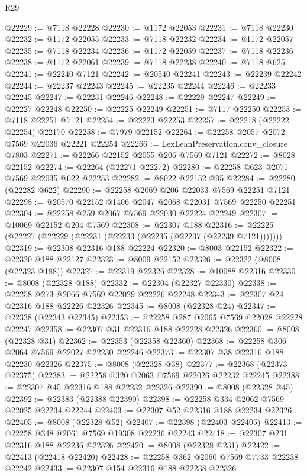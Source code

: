 \begin{lexlean}{R29}
\begin{coremodule}
@22229 := @7118 @22228
@22230 := @1172 @22053
@22231 := @7118 @22230
@22232 := @1172 @22055
@22233 := @7118 @22232
@22234 := @1172 @22057
@22235 := @7118 @22234
@22236 := @1172 @22059
@22237 := @7118 @22236
@22238 := @1172 @22061
@22239 := @7118 @22238
@22240 := @7118 @625
@22241 := @22240 @7121
@22242 := @20540 @22241
@22243 := @22239 @22242
@22244 := @22237 @22243
@22245 := @22235 @22244
@22246 := @22233 @22245
@22247 := @22231 @22246
@22248 := @22229 @22247
@22249 := @22227 @22248
@22250 := @22225 @22249
@22251 := @7117 @22250
@22253 := @7118 @22251 @7121
@22254 := @22223 @22253
@22257 := @22218 (@22222 @22254) @22170
@22258 := @7979 @22152
@22264 := @22258 @2057 @2072 @7569 @22036 @22221 @22254
@22266 := LexLeanPreservation.conv_closure @7803
@22271 := @22266 @22152 @2055 @206 @7569 @7121
@22272 := @8028 @22152
@22274 := @22264 (@22271 @22272)
@22280 := @22258 @623 @2071 @7569 @22035 @622 @22253
@22282 := @8022 @22152 @95
@22284 := @22280 (@22282 @622)
@22290 := @22258 @2069 @206 @22033 @7569 @22251 @7121
@22298 := @20570 @22152 @1406 @2047 @2068 @22031 @7569 @22250 @22251
@22304 := @22258 @259 @2067 @7569 @22030 @22224 @22249
@22307 := @10069 @22152 @204 @7569
@22308 := @22307 @188
@22316 := @22225 (@22227 (@22229 (@22231 (@22233 (@22235 (@22237 (@22239 @7121)))))))
@22319 := @22308 @22316 @188 @22224
@22320 := @8003 @22152
@22322 := @22320 @188 @22127
@22323 := @8009 @22152
@22326 := @22322 (@8008 (@22323 @188))
@22327 := @22319 @22326
@22328 := @10088 @22316
@22330 := @8008 (@22328 @188)
@22332 := @22304 (@22327 @22330)
@22338 := @22258 @273 @2066 @7569 @22029 @22226 @22248
@22343 := @22307 @24 @22316 @188 @22226 @22326
@22345 := @8008 (@22328 @24)
@22347 := @22338 (@22343 @22345)
@22353 := @22258 @287 @2065 @7569 @22028 @22228 @22247
@22358 := @22307 @31 @22316 @188 @22228 @22326
@22360 := @8008 (@22328 @31)
@22362 := @22353 (@22358 @22360)
@22368 := @22258 @306 @2064 @7569 @22027 @22230 @22246
@22373 := @22307 @38 @22316 @188 @22230 @22326
@22375 := @8008 (@22328 @38)
@22377 := @22368 (@22373 @22375)
@22383 := @22258 @320 @2063 @7569 @22026 @22232 @22245
@22388 := @22307 @45 @22316 @188 @22232 @22326
@22390 := @8008 (@22328 @45)
@22392 := @22383 (@22388 @22390)
@22398 := @22258 @334 @2062 @7569 @22025 @22234 @22244
@22403 := @22307 @52 @22316 @188 @22234 @22326
@22405 := @8008 (@22328 @52)
@22407 := @22398 (@22403 @22405)
@22413 := @22258 @348 @2061 @7569 @19308 @22236 @22243
@22418 := @22307 @231 @22316 @188 @22236 @22326
@22420 := @8008 (@22328 @231)
@22422 := @22413 (@22418 @22420)
@22428 := @22258 @362 @2060 @7569 @7733 @22238 @22242
@22433 := @22307 @154 @22316 @188 @22238 @22326

\end{coremodule}
\end{lexlean}
